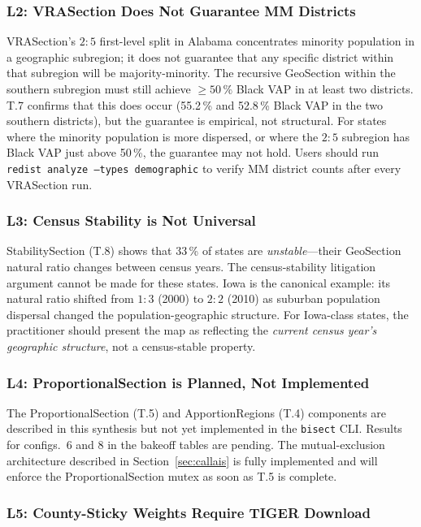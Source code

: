 \subsubsection*{L2: VRASection Does Not Guarantee MM Districts}

VRASection's $2:5$ first-level split in Alabama concentrates minority population
in a geographic subregion; it does not guarantee that any specific district
within that subregion will be majority-minority.
The recursive GeoSection within the southern subregion must still achieve $\geq 50\,\%$
Black VAP in at least two districts.
T.7 confirms that this does occur (55.2\,\% and 52.8\,\% Black VAP in the two
southern districts), but the guarantee is empirical, not structural.
For states where the minority population is more dispersed, or where the $2:5$
subregion has Black VAP just above 50\,\%, the guarantee may not hold.
Users should run \texttt{redist analyze --types demographic} to verify MM
district counts after every VRASection run.

\subsubsection*{L3: Census Stability is Not Universal}

StabilitySection (T.8) shows that 33\,\% of states are \emph{unstable}---their
GeoSection natural ratio changes between census years.
The census-stability litigation argument cannot be made for these states.
Iowa is the canonical example: its natural ratio shifted from $1:3$ (2000) to
$2:2$ (2010) as suburban population dispersal changed the population-geographic
structure.
For Iowa-class states, the practitioner should present the map as reflecting
the \emph{current census year's geographic structure}, not a census-stable
property.

\subsubsection*{L4: ProportionalSection is Planned, Not Implemented}

The ProportionalSection (T.5) and ApportionRegions (T.4) components are
described in this synthesis but not yet implemented in the \texttt{bisect} CLI.
Results for configs.~6 and 8 in the bakeoff tables are pending.
The mutual-exclusion architecture described in Section~\ref{sec:callais} is
fully implemented and will enforce the ProportionalSection mutex as soon as
T.5 is complete.

\subsubsection*{L5: County-Sticky Weights Require TIGER Download}

